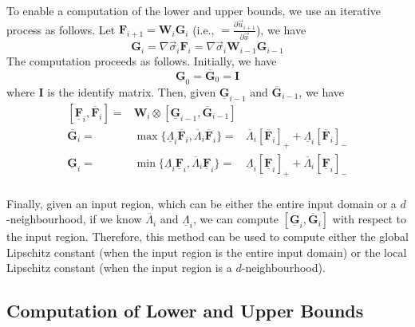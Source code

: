 To enable a computation of the lower and upper bounds, we use an iterative process as follows. Let $\textbf{F}_{i+1}=\textbf{W}_i\textbf{G}_i$ (i.e., $=\displaystyle\frac{\partial \Vec{u}_{i+1}}{\partial \Vec{x}}$), we have \begin{equation}
    \textbf{G}_i = \nabla\Vec{\sigma}_i\textbf{F}_i = \nabla\Vec{\sigma}_i\textbf{W}_{i-1}\textbf{G}_{i-1}
\end{equation}
The computation proceeds as follows. Initially, we have 
\begin{equation}
    \underline{\textbf{G}}_0 = \overline{\textbf{G}}_0 = \textbf{I}
\end{equation}
where $\textbf{I}$ is the identify matrix. Then, given $\underline{\textbf{G}}_{i-1} $ and $ \overline{\textbf{G}}_{i-1}$, we have 
\begin{equation}
\begin{array}{rll}
    [\underline{\textbf{F}}_{i},\overline{\textbf{F}}_{i}] =  &  \textbf{W}_i \otimes [\underline{\textbf{G}}_{i-1}, \overline{\textbf{G}}_{i-1}] & \\
    \overline{\textbf{G}}_i = & \max \{\underline{\Lambda}_i\overline{\textbf{F}}_i,\overline{\Lambda}_i\overline{\textbf{F}}_i\} = & \overline{\Lambda}_i[\overline{\textbf{F}}_i]_++\underline{\Lambda}_i[\overline{\textbf{F}}_i]_-\\
    \underline{\textbf{G}}_i = & \min \{\underline{\Lambda}_i\underline{\textbf{F}}_i,\overline{\Lambda}_i\underline{\textbf{F}}_i\} = & \underline{\Lambda}_i[\underline{\textbf{F}}_i]_++\overline{\Lambda}_i[\underline{\textbf{F}}_i]_- \\
\end{array}
\end{equation}

Finally, given an input region, which can be either the entire input domain or a $d$-neighbourhood, if we know ${\overline{\Lambda}}_i$ and ${\underline{\Lambda}}_i$, we can compute $[\underline{\textbf{G}}_i, \overline{\textbf{G}}_i]$ with respect to the input region. Therefore, this method can be used to compute either the global Lipschitz constant (when the input region is the entire input domain) or the local Lipschitz constant  (when the input region is a $d$-neighbourhood). 

\subsection*{Computation of Lower and Upper Bounds}

